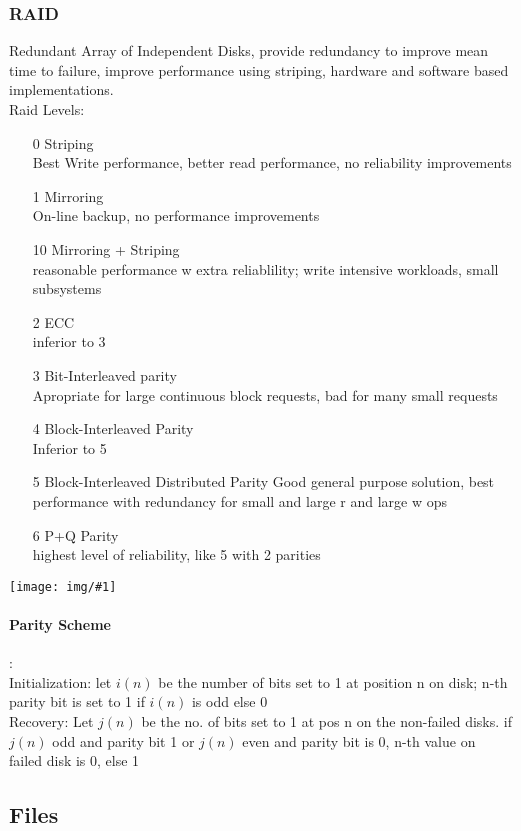 \documentclass[a4paper]{article}
\newcommand{\img}[1]{\begin{center}
    \texttt{[image: img/\#1]}
\end{center} }
\begin{document}
\begin{twocolumn}
\subsubsection{RAID}
Redundant Array of Independent Disks, provide redundancy to improve mean time to failure, improve performance using striping, hardware and software based implementations. \\
Raid Levels: 
\begin{enumerate}
	\item[0] Striping \\
	Best Write performance, better read performance, no reliability improvements
	\item[1] Mirroring \\
	On-line backup, no performance improvements
	\item[10] Mirroring + Striping \\
	reasonable performance w extra reliablility; write intensive workloads, small subsystems
	\item[2] ECC \\
	inferior to 3
	\item[3] Bit-Interleaved parity \\
	Apropriate for large continuous block requests, bad for many small requests
	\item[4] Block-Interleaved Parity \\
	Inferior to 5
	\item[5] Block-Interleaved Distributed Parity
	Good general purpose solution, best performance with redundancy for small and large r and large w ops
	\item[6] P+Q Parity \\
	highest level of reliability, like 5 with 2 parities
\end{enumerate}
\img{raid_overview.png}
\paragraph{Parity Scheme}: \\
Initialization: let $i(n)$ be the number of bits set to 1 at position n on disk; n-th parity bit is set to 1 if $i(n)$ is odd else 0 \\
Recovery: Let $j(n)$ be the no. of bits set to 1 at pos n on the non-failed disks. if $j(n)$ odd and parity bit 1 or $j(n)$ even and parity bit is 0, n-th value on failed disk is 0, else 1

\subsection{Files}

\end{twocolumn}
\end{document}

